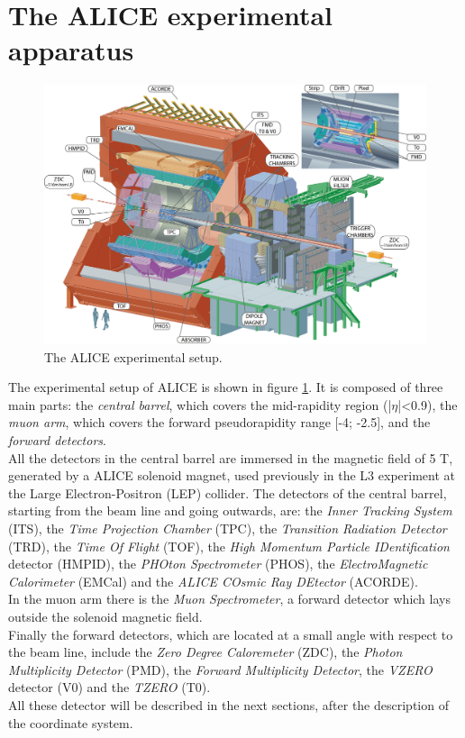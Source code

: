 \section{The ALICE experimental apparatus}
%
\begin{figure}
  \centering
  \includegraphics[scale=0.55]{figures/ALICEapp.jpg}
  \caption{The ALICE experimental setup.}
  \label{fig:ALICEapp}
\end{figure}
%
The experimental setup of ALICE is shown in figure \ref{fig:ALICEapp}. It is composed of three main parts: the \textit{central barrel}, which covers the mid-rapidity region (|$\eta$|<0.9), the \textit{muon arm}, which covers the forward pseudorapidity range [-4; -2.5], and the \textit{forward detectors}.\\
All the detectors in the central barrel are immersed in the magnetic field of 5 T, generated by a ALICE solenoid magnet, used previously in the L3 experiment at the Large Electron-Positron (LEP) collider. The detectors of the central barrel, starting from the beam line and going outwards, are: the \textit{Inner Tracking System} (ITS), the \textit{Time Projection Chamber} (TPC), the \textit{Transition Radiation Detector} (TRD), the \textit{Time Of Flight} (TOF), the \textit{High Momentum Particle IDentification} detector (HMPID), the \textit{PHOton Spectrometer} (PHOS), the \textit{ElectroMagnetic Calorimeter} (EMCal) and the \textit{ALICE COsmic Ray DEtector} (ACORDE).\\
In the muon arm there is the \textit{Muon Spectrometer}, a forward detector which lays outside the solenoid magnetic field.\\
Finally the forward detectors, which are located at a small angle with respect to the beam line, include the \textit{Zero Degree Caloremeter} (ZDC), the \textit{Photon Multiplicity Detector} (PMD), the \textit{Forward Multiplicity Detector}, the \textit{VZERO} detector (V0) and the \textit{TZERO} (T0).\\
All these detector will be described in the next sections, after the description of the coordinate system.
